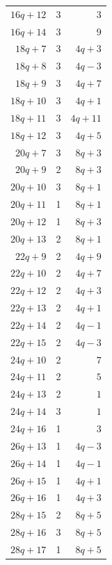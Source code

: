 \begin{longtable}{rrr}
$16q+12$ & 3 & $3$\\
$16q+14$ & 3 & $9$\\
$18q+7$ & 3 & $4q+3$\\
$18q+8$ & 3 & $4q-3$\\
$18q+9$ & 3 & $4q+7$\\
$18q+10$ & 3 & $4q+1$\\
$18q+11$ & 3 & $4q+11$\\
$18q+12$ & 3 & $4q+5$\\
$20q+7$ & 3 & $8q+3$\\
$20q+9$ & 2 & $8q+3$\\
$20q+10$ & 3 & $8q+1$\\
$20q+11$ & 1 & $8q+1$\\
$20q+12$ & 1 & $8q+3$\\
$20q+13$ & 2 & $8q+1$\\
$22q+9$ & 2 & $4q+9$\\
$22q+10$ & 2 & $4q+7$\\
$22q+12$ & 2 & $4q+3$\\
$22q+13$ & 2 & $4q+1$\\
$22q+14$ & 2 & $4q-1$\\
$22q+15$ & 2 & $4q-3$\\
$24q+10$ & 2 & $7$\\
$24q+11$ & 2 & $5$\\
$24q+13$ & 2 & $1$\\
$24q+14$ & 3 & $1$\\
$24q+16$ & 1 & $3$\\
$26q+13$ & 1 & $4q-3$\\
$26q+14$ & 1 & $4q-1$\\
$26q+15$ & 1 & $4q+1$\\
$26q+16$ & 1 & $4q+3$\\
$28q+15$ & 2 & $8q+5$\\
$28q+16$ & 3 & $8q+5$\\
$28q+17$ & 1 & $8q+5$\\
\end{longtable}
\endgroup

